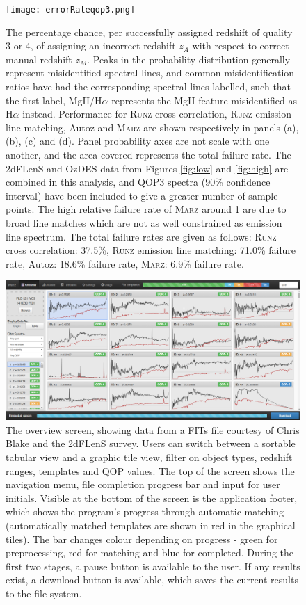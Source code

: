 \documentclass[iop]{emulateapj}
\newcommand{\runz}{\textsc{Runz}}
\newcommand{\thesisname}{\textsc{Marz}}
\begin{document}
\begin{figure}[h]
\centering
\texttt{[image: errorRateqop3.png]}
\caption{The percentage chance, per successfully assigned redshift of quality 3 or 4, of assigning an incorrect redshift $z_A$ with respect to correct manual redshift $z_M$. Peaks in the probability distribution generally represent misidentified spectral lines, and common misidentification ratios have had the corresponding spectral lines labelled, such that the first label, MgII/H$\alpha$ represents the MgII feature misidentified as H$\alpha$ instead. Performance for \runz{} cross correlation, \runz{} emission line matching, Autoz and \thesisname{} are shown respectively in panels (a), (b), (c) and (d). Panel probability axes are not scale with one another, and the area covered represents the total failure rate. The 2dFLenS and OzDES data from Figures \ref{fig:low} and \ref{fig:high} are combined in this analysis, and QOP3 spectra (90\% confidence interval) have been included to give a greater number of sample points. The high relative failure rate of \thesisname{} around 1 are due to broad line matches which are not as well constrained as emission line spectrum. The total failure rates are given as follows: \runz{} cross correlation: 37.5\%, \runz{} emission line matching: 71.0\% failure rate, Autoz: 18.6\% failure rate, \thesisname{}: 6.9\% failure rate.}
\label{fig:f4}
\end{figure}






\begin{figure}[H]
\centering
\includegraphics[width=\textwidth]{InterfaceZ.png}
\caption{The overview screen, showing data from a FITs file courtesy of Chris Blake and the 2dFLenS survey. Users can switch between a sortable tabular view and a graphic tile view, filter on object types, redshift ranges, templates and QOP values. The top of the screen shows the navigation menu, file completion progress bar and input for user initials. Visible at the bottom of the screen is the application footer, which shows the program's progress through automatic matching (automatically matched templates are shown in red in the graphical tiles). The bar changes colour depending on progress - green for preprocessing, red for matching and blue for completed. During the first two stages, a pause button is available to the user. If any results exist, a download button is available, which saves the current results to the file system.}
\label{fig:overview}
\end{figure}
\end{document}
